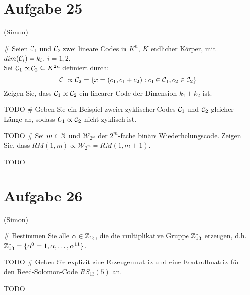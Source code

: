 \section*{Aufgabe 25}
(Simon)
\begin{myList}
#
Seien $\mathcal{C}_1$ und $\mathcal{C}_2$ zwei lineare Codes in $K^n$, $K$ endlicher Körper, mit $dim(\mathcal{C}_i) = k_i$, $i = 1,2$.\\
Sei $\mathcal{C}_1 \propto \mathcal{C}_2 \subseteq K^{2n}$ definiert durch:
\begin{equation*}
	\mathcal{C}_1 \propto \mathcal{C}_2 = \lbrace x = (c_1, c_1 + c_2) : c_1 \in \mathcal{C}_1, c_2 \in \mathcal{C}_2 \rbrace
\end{equation*}
Zeigen Sie, dass $\mathcal{C}_1 \propto \mathcal{C}_2$ ein linearer Code der Dimension $k_1 + k_2$ ist.\medskip

TODO
#
Geben Sie ein Beispiel zweier zyklischer Codes $\mathcal{C}_1$ und $\mathcal{C}_2$ gleicher Länge an, sodass $C_1 \propto \mathcal{C}_2$ nicht zyklisch ist.\medskip

TODO
#
Sei $m \in \mathbb{N}$ und $\mathcal{W}_{2^m}$ der $2^m$-fache binäre Wiederholungscode. Zeigen Sie, dass $RM(1,m) \propto \mathcal{W}_{2^m} = RM(1,m+1)$.\medskip

TODO
\end{myList}

\section*{Aufgabe 26}
(Simon)
\begin{myList}
#
Bestimmen Sie alle $\alpha \in \mathbb{Z}_{13}$, die die multiplikative Gruppe $\mathbb{Z}_{13}^{\ast}$ erzeugen, d.h. $\mathbb{Z}_{13}^{\ast} = \lbrace \alpha^0 = 1,\alpha,\ldots,\alpha^{11} \rbrace$.
\medskip

TODO
#
Geben Sie explizit eine Erzeugermatrix und eine Kontrollmatrix für den Reed-Solomon-Code $RS_{13}(5)$ an.\medskip

TODO
\end{myList}

